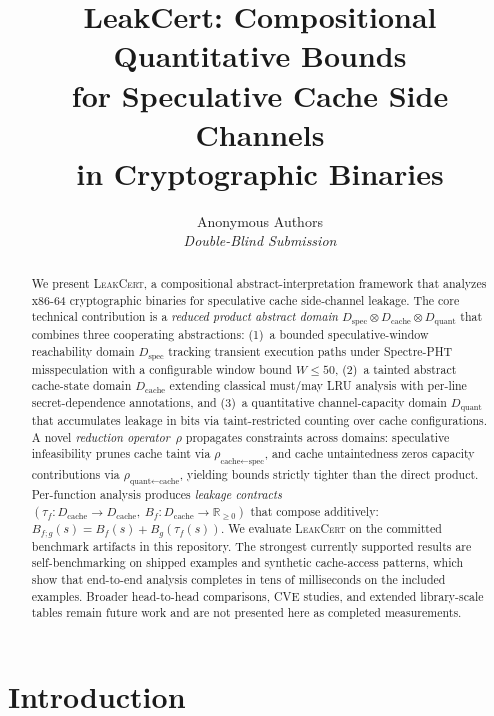 \documentclass{article}
\title{\textbf{LeakCert: Compositional Quantitative Bounds\\
for Speculative Cache Side Channels\\
in Cryptographic Binaries}}
\author{
  Anonymous Authors \\
  \textit{Double-Blind Submission}
}
\date{}
\theoremstyle{definition}
\theoremstyle{remark}
\newcommand{\Dspec}{D_{\text{spec}}}
\newcommand{\Dcache}{D_{\text{cache}}}
\newcommand{\Dquant}{D_{\text{quant}}}
\newcommand{\Bf}{B_f}
\newcommand{\Bg}{B_g}
\newcommand{\tauf}{\tau_f}
\newcommand{\rhocachespec}{\rho_{\text{cache} \leftarrow \text{spec}}}
\newcommand{\rhoquantcache}{\rho_{\text{quant} \leftarrow \text{cache}}}
\newcommand{\LeakCert}{\textsc{LeakCert}}
\begin{document}
\maketitle

\begin{abstract}
We present \LeakCert{}, a compositional abstract-interpretation framework
that analyzes x86-64 cryptographic binaries for speculative cache side-channel
leakage.  The core technical contribution is a \emph{reduced product abstract
domain} $\Dspec \otimes \Dcache \otimes \Dquant$ that combines three cooperating
abstractions: (1)~a bounded speculative-window reachability domain
$\Dspec$ tracking transient execution paths under Spectre-PHT
misspeculation with a configurable window bound $W \leq 50$,
(2)~a tainted abstract cache-state domain $\Dcache$ extending classical
must/may LRU analysis with per-line secret-dependence annotations, and (3)~a
quantitative channel-capacity domain $\Dquant$ that accumulates leakage in bits
via taint-restricted counting over cache configurations.  A novel
\emph{reduction operator}~$\rho$ propagates constraints across
domains: speculative infeasibility prunes cache taint via
$\rhocachespec$, and cache untaintedness zeros capacity contributions
via $\rhoquantcache$, yielding bounds strictly tighter than the direct
product.  Per-function analysis produces \emph{leakage contracts}
$(\tauf : \Dcache \to \Dcache,\ \Bf : \Dcache \to \mathbb{R}_{\geq 0})$ that
compose additively: $B_{f;g}(s) = \Bf(s) + \Bg(\tauf(s))$.  We evaluate
\LeakCert{} on the committed benchmark artifacts in this repository.
The strongest currently supported results are self-benchmarking on shipped
examples and synthetic cache-access patterns, which show that end-to-end
analysis completes in tens of milliseconds on the included examples.
Broader head-to-head comparisons, CVE studies, and extended library-scale
tables remain future work and are not presented here as completed
measurements.
\end{abstract}

\section{Introduction}
\label{sec:intro}
\end{document}

